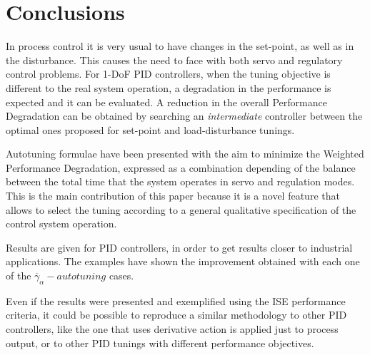 %
\section{Conclusions}
\label{conclusions}
%

In process control it is very usual to have changes in the
set-point, as well as in the disturbance. This causes the need to
face with both servo and regulatory control problems. For 1-DoF
PID controllers, when the tuning objective is different to the
real system operation, a degradation in the performance is
expected and it can be evaluated. A reduction in the overall
Performance Degradation can be obtained by searching an
\emph{intermediate} controller between the optimal ones proposed
for set-point and load-disturbance tunings.

Autotuning formulae have been presented with the aim to minimize
the Weighted Performance Degradation, expressed as a combination
depending of the balance between the total time that the system
operates in servo and regulation modes. This is the main
contribution of this paper because it is a novel feature that
allows to select the tuning according to a general qualitative
specification of the control system operation.

Results are given for PID controllers, in order to get results
closer to industrial applications. The examples have shown the
improvement obtained with each one of the
$\overline{\gamma}_{\alpha}-autotuning$ cases.

Even if the results were presented and exemplified using the ISE
performance criteria, it could be possible to reproduce a similar
methodology to other PID controllers, like the one that uses
derivative action is applied just to process output, or to other
PID tunings with different performance objectives.
